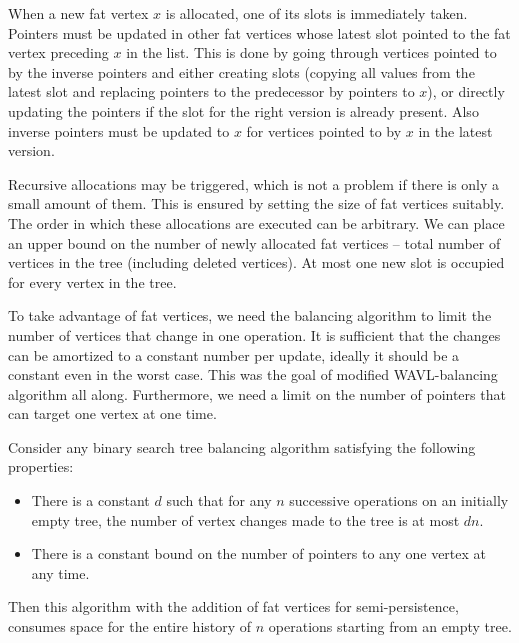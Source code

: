 When a new fat vertex $x$ is allocated, one of its slots is immediately taken. 
Pointers must be updated in other fat vertices whose latest slot pointed to the fat vertex preceding $x$ in the list. 
This is done by going through vertices pointed to by the inverse pointers and either creating slots (copying all values from the latest slot and replacing pointers to the predecessor by pointers to $x$), or directly updating the pointers if the slot for the right version is already present. 
Also inverse pointers must be updated to $x$ for vertices pointed to by $x$ in the latest version.

Recursive allocations may be triggered, which is not a problem if there is only a small amount of them. 
This is ensured by setting the size of fat vertices suitably. 
The order in which these allocations are executed can be arbitrary.
We can place an upper bound on the number of newly allocated fat vertices -- total number of vertices in the tree (including deleted vertices). 
At most one new slot is occupied for every vertex in the tree.

To take advantage of fat vertices, we need the balancing algorithm to limit the number of vertices that change in one operation. 
It is sufficient that the changes can be amortized to a constant number per update, ideally it should be a constant even in the worst case.
This was the goal of modified WAVL-balancing algorithm all along. 
Furthermore, we need a limit on the number of pointers that can target one vertex at one time.

\begin{prop}
Consider any binary search tree balancing algorithm satisfying the following properties:
\begin{itemize}
\item 
There is a constant $d$ such that for any $n$ successive operations on an initially empty tree, the number of vertex changes made to the tree is at most $dn$. 
\item 
There is a constant bound on the number of pointers to any one vertex at any time.
\end{itemize}
Then this algorithm with the addition of fat vertices for semi-persistence, consumes  space for the entire history of $n$ operations starting from an empty tree.
\end{prop}

